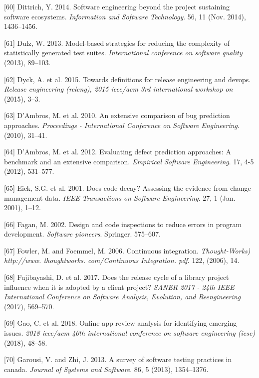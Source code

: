 \documentclass[]{book}
\begin{document}
\hypertarget{ref-Dittrich2014}{}
{[}60{]} Dittrich, Y. 2014. Software engineering beyond the project
sustaining software ecosystems. \emph{Information and Software
Technology}. 56, 11 (Nov. 2014), 1436--1456.

\hypertarget{ref-dulz2013model}{}
{[}61{]} Dulz, W. 2013. Model-based strategies for reducing the
complexity of statistically generated test suites. \emph{International
conference on software quality} (2013), 89--103.

\hypertarget{ref-dyck2015a}{}
{[}62{]} Dyck, A. et al. 2015. Towards definitions for release
engineering and devops. \emph{Release engineering (releng), 2015
ieee/acm 3rd international workshop on} (2015), 3--3.

\hypertarget{ref-DAmbros2010}{}
{[}63{]} D'Ambros, M. et al. 2010. An extensive comparison of bug
prediction approaches. \emph{Proceedings - International Conference on
Software Engineering}. (2010), 31--41.

\hypertarget{ref-DAmbros2012}{}
{[}64{]} D'Ambros, M. et al. 2012. Evaluating defect prediction
approaches: A benchmark and an extensive comparison. \emph{Empirical
Software Engineering}. 17, 4-5 (2012), 531--577.

\hypertarget{ref-eick2001}{}
{[}65{]} Eick, S.G. et al. 2001. Does code decay? Assessing the evidence
from change management data. \emph{IEEE Transactions on Software
Engineering}. 27, 1 (Jan. 2001), 1--12.

\hypertarget{ref-fagan2002design}{}
{[}66{]} Fagan, M. 2002. Design and code inspections to reduce errors in
program development. \emph{Software pioneers}. Springer. 575--607.

\hypertarget{ref-fowler2006continuous}{}
{[}67{]} Fowler, M. and Foemmel, M. 2006. Continuous integration.
\emph{Thought-Works) http://www. thoughtworks. com/Continuous
Integration. pdf}. 122, (2006), 14.

\hypertarget{ref-fujibayashi2017a}{}
{[}68{]} Fujibayashi, D. et al. 2017. Does the release cycle of a
library project influence when it is adopted by a client project?
\emph{SANER 2017 - 24th IEEE International Conference on Software
Analysis, Evolution, and Reengineering} (2017), 569--570.

\hypertarget{ref-gao2018online}{}
{[}69{]} Gao, C. et al. 2018. Online app review analysis for identifying
emerging issues. \emph{2018 ieee/acm 40th international conference on
software engineering (icse)} (2018), 48--58.

\hypertarget{ref-GAROUSI20131354}{}
{[}70{]} Garousi, V. and Zhi, J. 2013. A survey of software testing
practices in canada. \emph{Journal of Systems and Software}. 86, 5
(2013), 1354--1376.
\end{document}
